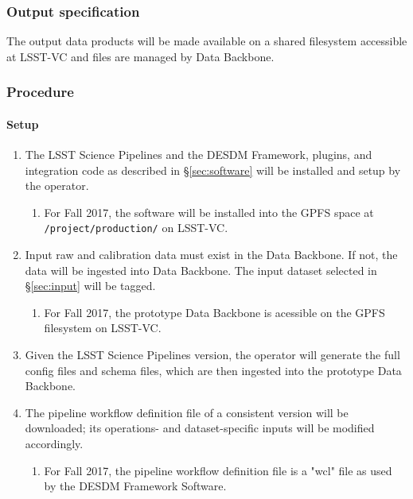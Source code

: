 \subsubsection{Output specification}

The output data products will be made available on a shared filesystem accessible at LSST-VC and files are managed by Data Backbone.

\subsubsection{Procedure}

\paragraph{Setup}
\begin{enumerate}

  \item{The LSST Science Pipelines and the DESDM Framework, plugins, and integration code as described in \S\ref{sec:software}  will be installed and setup by the operator.}
  \begin{enumerate}
    \item{For Fall 2017, the software will be installed into the GPFS space at \texttt{/project/production/} on LSST-VC.}
  \end{enumerate}
  \item{Input raw and calibration data must exist in the Data Backbone. If not, the data will be ingested into Data Backbone.  The input dataset selected in \S\ref{sec:input} will be tagged.}
  \begin{enumerate}
    \item{For Fall 2017, the prototype Data Backbone is acessible on the GPFS filesystem on LSST-VC.}
  \end{enumerate}
  \item{Given the LSST Science Pipelines version, the operator will generate the full config files and schema files, which are then ingested into the prototype Data Backbone.}
  \item{The pipeline workflow definition file of a consistent version will be downloaded; its operations- and dataset-specific inputs will be modified accordingly.}
  \begin{enumerate}
    \item{For Fall 2017, the pipeline workflow definition file is a "wcl" file as used by the DESDM Framework Software.}
  \end{enumerate}
\end{enumerate}

